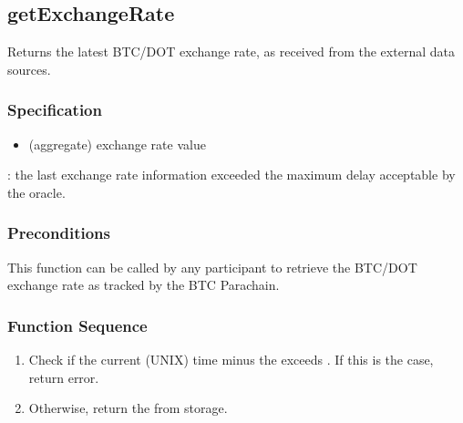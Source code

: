 \documentclass[a4paper,10pt,english]{sphinxmanual}
\begin{document}
\subsection{getExchangeRate}
\label{\detokenize{spec/oracle:getexchangerate}}\label{\detokenize{spec/oracle:id4}}
Returns the latest BTC/DOT exchange rate, as received from the external data sources.


\subsubsection{Specification}
\label{\detokenize{spec/oracle:id5}}


\begin{itemize}
\item {} 
 (aggregate) exchange rate value

\end{itemize}



: the last exchange rate information exceeded the maximum delay acceptable by the oracle.


\subsubsection{Preconditions}
\label{\detokenize{spec/oracle:id6}}
This function can be called by any participant to retrieve the BTC/DOT exchange rate as tracked by the BTC Parachain.


\subsubsection{Function Sequence}
\label{\detokenize{spec/oracle:id7}}\begin{enumerate}
%
\item {} 
Check if the current (UNIX) time minus the  exceeds . If this is the case, return  error.

\item {} 
Otherwise, return the  from storage.

\end{enumerate}
\end{document}
